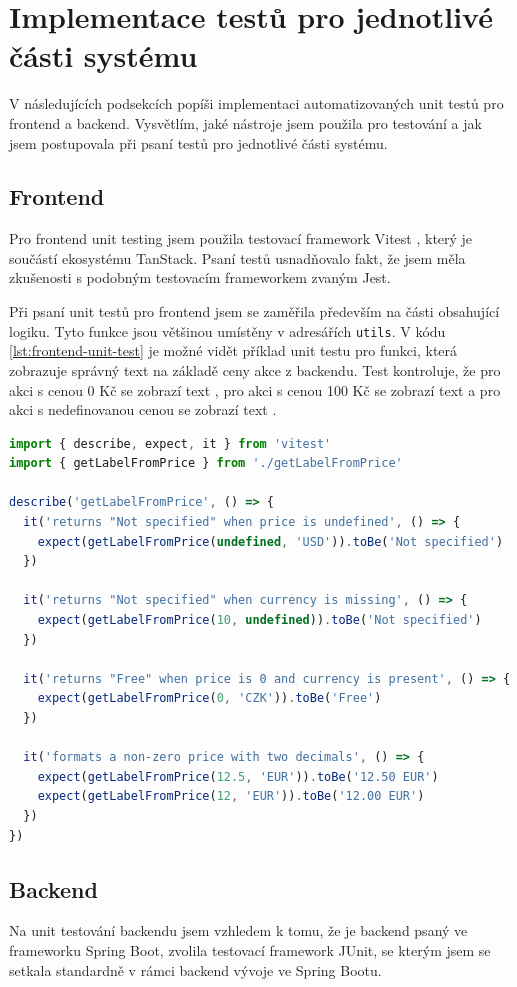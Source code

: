 \section{Implementace testů pro jednotlivé části systému}
V následujících podsekcích popíši implementaci automatizovaných unit testů pro frontend a backend. Vysvětlím, jaké nástroje jsem použila pro testování a jak jsem postupovala při psaní testů pro jednotlivé části systému.
\subsection{Frontend}
Pro frontend unit testing jsem použila testovací framework Vitest \cite{vitest_docs}, který je součástí ekosystému TanStack. Psaní testů usnadňovalo fakt, že jsem měla zkušenosti s podobným testovacím frameworkem zvaným Jest. 

Při psaní unit testů pro frontend jsem se zaměřila především na části obsahující logiku. Tyto funkce jsou většinou umístěny v adresářích \texttt{utils}. V kódu \ref{lst:frontend-unit-test} je možné vidět příklad unit testu pro funkci, která zobrazuje správný text na základě ceny akce z backendu. Test kontroluje, že pro akci s cenou 0 Kč se zobrazí text , pro akci s cenou 100 Kč se zobrazí text  a pro akci s nedefinovanou cenou se zobrazí text .

\begin{lstlisting}[language=TypeScript, caption={Příklad unit testu pro frontend.}, label={lst:frontend-unit-test}]
import { describe, expect, it } from 'vitest'
import { getLabelFromPrice } from './getLabelFromPrice'

describe('getLabelFromPrice', () => {
  it('returns "Not specified" when price is undefined', () => {
    expect(getLabelFromPrice(undefined, 'USD')).toBe('Not specified')
  })

  it('returns "Not specified" when currency is missing', () => {
    expect(getLabelFromPrice(10, undefined)).toBe('Not specified')
  })

  it('returns "Free" when price is 0 and currency is present', () => {
    expect(getLabelFromPrice(0, 'CZK')).toBe('Free')
  })

  it('formats a non-zero price with two decimals', () => {
    expect(getLabelFromPrice(12.5, 'EUR')).toBe('12.50 EUR')
    expect(getLabelFromPrice(12, 'EUR')).toBe('12.00 EUR')
  })
})

\end{lstlisting}
\subsection{Backend}
Na unit testování backendu jsem vzhledem k tomu, že je backend psaný ve frameworku Spring Boot, zvolila testovací framework JUnit, se kterým jsem se setkala standardně v rámci backend vývoje ve Spring Bootu. \cite{junit_docs}

